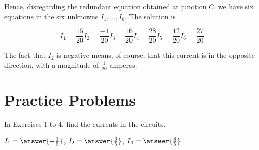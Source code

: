 \documentclass{ximera}
\begin{document}
\begin{example}
\begin{explanation}
Hence, disregarding the redundant equation obtained at junction $C$, we have six equations in the six unknowns $I_1, \dots, I_6$. The solution is

$$	I_1 = \frac{15}{20} I_2 = \frac{-1}{20}I_3 = \frac{16}{20} I_4 = \frac{28}{20}I_5 = \frac{12}{20}I_6 = \frac{27}{20}$$

The fact that $I_2$ is negative means, of course, that this current is in the opposite direction, with a magnitude of $\frac{1}{20}$ amperes.

\end{explanation}

\end{example}

\section*{Practice Problems}



In Exercises 1 to 4, find the currents in the circuits.

\begin{problem}
%
\end{problem}

\begin{problem}
%

$ I_1 = \answer{-\frac{1}{5}}$, $I_2 = \answer{\frac{3}{5}}$, $I_3 = \answer{\frac{4}{5}}$


\end{problem}

\begin{problem}
%
\end{problem}
\end{document}
